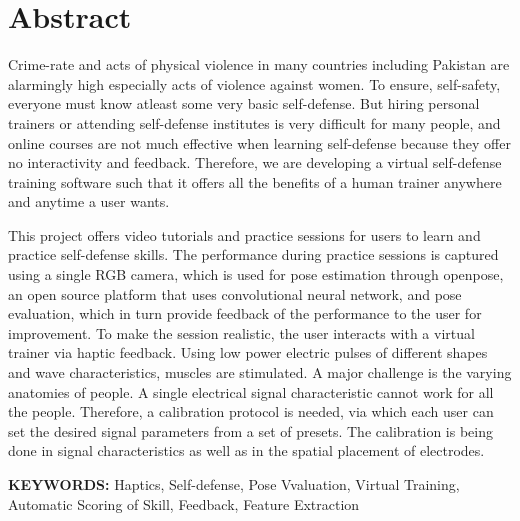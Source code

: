 \documentclass[12pt,twosided]{report}
\begin{document}



\chapter*{Abstract}
Crime-rate and acts of physical violence in many countries including Pakistan are alarmingly high especially acts of violence against women. To ensure, self-safety, everyone must know atleast some very basic self-defense. But hiring personal trainers or attending self-defense institutes is very difficult for many people, and online courses are not much effective when learning self-defense because they offer no interactivity and feedback. Therefore, we are developing a virtual self-defense training software such that it offers all the benefits of a human trainer anywhere and anytime a user wants. 

This project offers video tutorials and practice sessions for users to learn and practice self-defense skills. The performance during practice sessions is captured using a single RGB camera, which is used for pose estimation through openpose, an open source platform that uses convolutional neural network, and pose evaluation, which in turn provide feedback of the performance to the user for improvement. To make the session realistic, the user interacts with a virtual trainer via haptic feedback. Using low power electric pulses of different shapes and wave characteristics, muscles are stimulated. A major challenge is the varying anatomies of people. A single electrical signal characteristic cannot work for all the people. Therefore, a calibration protocol is needed, via which each user can set the desired signal parameters from a set of presets. The calibration is being done in signal characteristics as well as in the spatial placement of electrodes.

\begin{flushleft}
\textbf{KEYWORDS:} Haptics, Self-defense, Pose Vvaluation, Virtual Training, Automatic Scoring of Skill, Feedback, Feature Extraction
\end{flushleft}
\tableofcontents
\listoffigures
\listoftables
\end{document}
